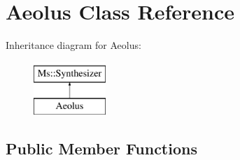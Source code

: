 \hypertarget{class_aeolus}{}\section{Aeolus Class Reference}
\label{class_aeolus}
Inheritance diagram for Aeolus\+:\begin{figure}[H]
\begin{center}
\leavevmode
\includegraphics[height=2.000000cm]{class_aeolus}
\end{center}
\end{figure}
\subsection*{Public Member Functions}
